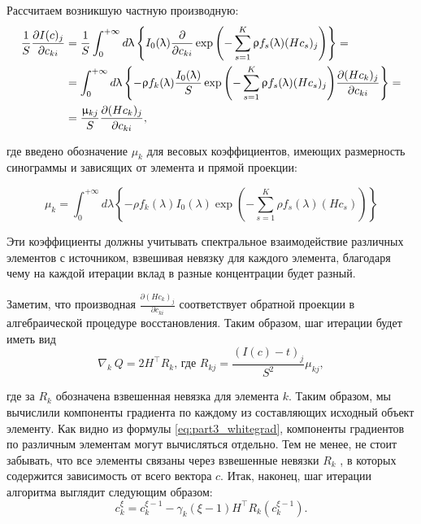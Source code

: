 Рассчитаем возникшую частную производную:
\begin{equation}
  \notag
  \begin{split}
  \frac 1 S
  \frac {\partial I(c)_j} {\partial c_{ki}} &= 
  \frac 1 S
  \int_0^{+\infty} {d\lambda \left\{
    I_0(\lambda) 
    \frac \partial {\partial c_{ki}}
    \exp{\left(
      -\sum_{s=1}^K {\rho f_s(\lambda) (H c_s)_j} 
      \right)}
    \right\}} = \\
  &= 
  \int_0^{+\infty} {d\lambda \left\{
    -\rho f_k(\lambda) 
    \frac {I_0(\lambda)} {S}
    \exp{\left(
      -\sum_{s=1}^K {\rho f_s(\lambda) (H c_s)_j} 
         \right)}
    \frac {\partial (H c_k)_j} {\partial c_{ki}}
    \right\}} = \\
  &= 
  \frac {\mu_{kj}} {S} \frac {\partial (H c_k)_j} {\partial c_{ki}},
  \end{split}
\end{equation}

где введено обозначение $\mu_k$ для весовых коэффициентов, имеющих размерность синограммы и зависящих от элемента и прямой проекции:

\begin{equation}
  \label{eq:weights}
  \mu_{k} = \int_0^{+\infty} {d\lambda \left\{
    -\rho f_k(\lambda) 
    I_0(\lambda)
    \exp{\left(
      -\sum_{s=1}^K {\rho f_s(\lambda) (H c_s)} 
         \right)}
    \right\}}
\end{equation}

Эти коэффициенты должны учитывать спектральное взаимодействие различных элементов с источником, взвешивая невязку для каждого элемента, благодаря чему на каждой итерации вклад в разные концентрации будет разный.

Заметим, что производная $\frac {\partial (H c_k)_j} {\partial c_{ki}}$ соответствует обратной проекции в алгебраической процедуре восстановления. 
Таким образом, шаг итерации будет иметь вид
\begin{equation} \label{eq:part3_whitegrad}
  \nabla_k \ Q = 2H^\intercal R_k \text{, где } R_{kj} = \frac {(I(c) - t)_j} {S^2} \mu_{kj},
\end{equation}

где за $R_k$ обозначена взвешенная невязка для элемента $k$. 
Таким образом, мы вычислили компоненты градиента по каждому из составляющих исходный объект элементу.
Как видно из формулы \ref{eq:part3_whitegrad}, компоненты градиентов по различным элементам могут вычисляться отдельно.
Тем не менее, не стоит забывать, что все элементы связаны через взвешенные невязки $R_k$ , в которых содержится зависимость от всего вектора $c$.
Итак, наконец, шаг итерации алгоритма выглядит следующим образом:
\begin{equation}
  \label{white_iteration}
  c_k^\xi = c_k^{\xi - 1} - \gamma_k (\xi - 1) H^\intercal R_k(c_k^{\xi - 1}).
\end{equation}

